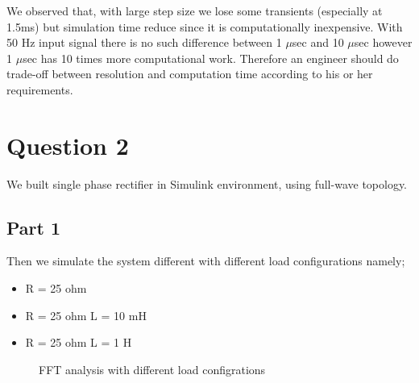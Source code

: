 \documentclass[fleqn, a4paper]{article}
\begin{document}
We observed that, with large step size we lose some transients (especially at 1.5ms) but simulation time reduce since it is computationally inexpensive. With 50 Hz input signal there is no such difference between 1 $\mu$sec and 10 $\mu$sec however 1 $\mu$sec has 10 times more computational work. Therefore an engineer should do trade-off between resolution and computation time according to his or her requirements.  
\section*{Question 2}
We built single phase rectifier in Simulink environment, using full-wave topology. 
\subsection*{Part 1}
Then we simulate the system different with different load configurations namely;
\begin{itemize}
	\item R = 25 ohm
	\item R = 25 ohm L = 10 mH
	\item R = 25 ohm L = 1 H
\end{itemize}
\begin{figure}[H]%
    \centering
    \qquad
    \qquad
    \caption{FFT analysis with different load configrations}%
    \label{fig:example}%
\end{figure}
\end{document}
